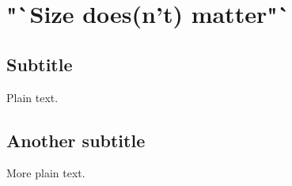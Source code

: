 \section{"`Size does(n't) matter"`}

\subsection{Subtitle}

Plain text.

\subsection{Another subtitle}

More plain text.
